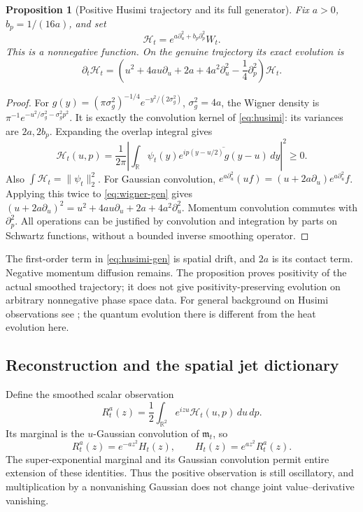 \documentclass[11pt]{article}
\numberwithin{equation}{section}
\newtheorem{proposition}[theorem]{Proposition}
\theoremstyle{definition}
\theoremstyle{remark}
\newcommand{\dd}{\,d}
\newcommand{\HH}{\mathcal H}
\begin{document}
\begin{proposition}[Positive Husimi trajectory and its full generator]
\label{prop:husimi}
Fix $a>0$, $b_p=1/(16a)$, and set
\begin{equation}
 \HH_t=e^{a\partial_u^2+b_p\partial_p^2}W_t.
 \label{eq:husimi}
\end{equation}
This is a nonnegative function. On the genuine trajectory its exact
evolution is
\begin{equation}
 \partial_t\HH_t=\left(u^2+4au\partial_u+2a
                   +4a^2\partial_u^2-\frac14\partial_p^2\right)\HH_t.
 \label{eq:husimi-gen}
\end{equation}
\end{proposition}
\begin{proof}
For $g(y)=(\pi\sigma_g^2)^{-1/4}e^{-y^2/(2\sigma_g^2)}$,
$\sigma_g^2=4a$, the Wigner density is
$\pi^{-1}e^{-u^2/\sigma_g^2-\sigma_g^2p^2}$. It is exactly the
convolution kernel of \eqref{eq:husimi}: its variances are $2a,2b_p$.
Expanding the overlap integral gives
\[
 \HH_t(u,p)=\frac1{2\pi}\left|
 \int_{\mathbb R}\psi_t(y)
       \overline{e^{ip(y-u/2)}g(y-u)}\dd y\right|^2\ge0.
\]
Also $\int\HH_t=\|\psi_t\|_2^2$.
For Gaussian convolution,
$e^{a\partial_u^2}(uf)=(u+2a\partial_u)e^{a\partial_u^2}f$.
Applying this twice to \eqref{eq:wigner-gen} gives
$(u+2a\partial_u)^2=u^2+4au\partial_u+2a+4a^2\partial_u^2$.
Momentum convolution commutes with $\partial_p^2$. All operations can
be justified by convolution and integration by parts on Schwartz
functions, without a bounded inverse smoothing operator.
\end{proof}
The first-order term in \eqref{eq:husimi-gen} is spatial drift, and
$2a$ is its contact term. Negative momentum diffusion remains. The
proposition proves positivity of the actual smoothed trajectory; it
does not give positivity-preserving evolution on arbitrary nonnegative
phase space data. For general background on Husimi observations see
\cite{trushechkin}; the quantum evolution there is different from the
heat evolution here.

\subsection{Reconstruction and the spatial jet dictionary}
Define the smoothed scalar observation
\begin{equation}
 R_t^a(z)=\frac12\int_{\mathbb R^2}e^{izu}\HH_t(u,p)\dd u\dd p.
\end{equation}
Its marginal is the $u$-Gaussian convolution of $\mathfrak m_t$, so
\begin{equation}
 R_t^a(z)=e^{-az^2}H_t(z),\qquad
 H_t(z)=e^{az^2}R_t^a(z).
 \label{eq:reconstruction}
\end{equation}
The super-exponential marginal and its Gaussian convolution permit
entire extension of these identities. Thus the positive observation is
still oscillatory, and multiplication by a nonvanishing Gaussian
does not change joint value--derivative vanishing.
\end{document}
